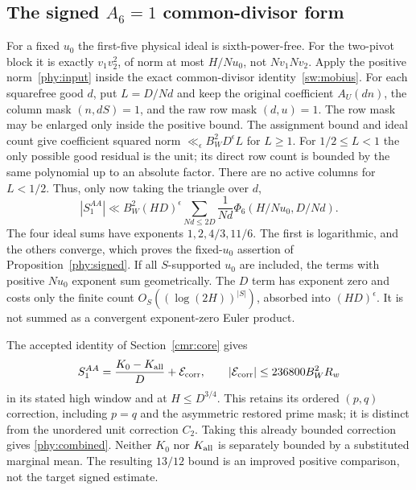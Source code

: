 \documentclass[11pt]{article}
\theoremstyle{definition}\newtheorem{definition}[theorem]{Definition}
\theoremstyle{remark}\newtheorem{remark}[theorem]{Remark}
\begin{document}
\subsection{The signed $A_6=1$ common-divisor form}\label{phy:divisor-proof}
For a fixed $u_0$ the first-five physical ideal is sixth-power-free.
For the two-pivot block it is exactly $v_1v_2^2$, of norm at most
$H/Nu_0$, not $Nv_1Nv_2$. Apply the positive norm~\eqref{phy:input}
inside the exact common-divisor identity~\eqref{sw:mobius}.
For each squarefree good $d$, put $L=D/Nd$ and keep the original
coefficient $A_U(dn)$, the column mask $(n,dS)=1$, and the raw row mask
$(d,u)=1$. The row mask may be enlarged only inside the positive bound.
The assignment bound and ideal count give coefficient squared norm
$\ll_\epsilon B_W^2D^\epsilon L$ for $L\ge1$.
For $1/2\le L<1$ the only possible good residual is the unit; its direct
row count is bounded by the same polynomial up to an absolute factor.
There are no active columns for $L<1/2$.
Thus, only now taking the triangle over $d$,
\[
 |S_1^{AA}|\ll B_W^2(HD)^\epsilon
     \sum_{Nd\le2D}\frac1{Nd}\Phi_6(H/Nu_0,D/Nd).
\]
The four ideal sums have exponents $1,2,4/3,11/6$.
The first is logarithmic, and the others converge, which proves the
fixed-$u_0$ assertion of Proposition~\ref{phy:signed}.
If all $S$-supported $u_0$ are included, the terms with positive
$Nu_0$ exponent sum geometrically. The $D$ term has exponent zero
and costs only the finite count
$O_S((\log(2H))^{|S|})$, absorbed into $(HD)^\epsilon$.
It is not summed as a convergent exponent-zero Euler product.

The accepted identity of Section~\ref{cmr:core} gives
\[
 S_1^{AA}=\frac{K_0-K_{\rm all}}D+\mathcal E_{\rm corr},
 \qquad |\mathcal E_{\rm corr}|\le236800B_W^2R_w
\]
in its stated high window and at $H\le D^{3/4}$.
This retains its ordered $(p,q)$ correction, including $p=q$ and the
asymmetric restored prime mask; it is distinct from the unordered
unit correction $C_2$. Taking this already bounded correction gives
\eqref{phy:combined}. Neither $K_0$ nor $K_{\rm all}$ is separately
bounded by a substituted marginal mean. The resulting $13/12$ bound
is an improved positive comparison, not the target signed estimate.
\end{document}
